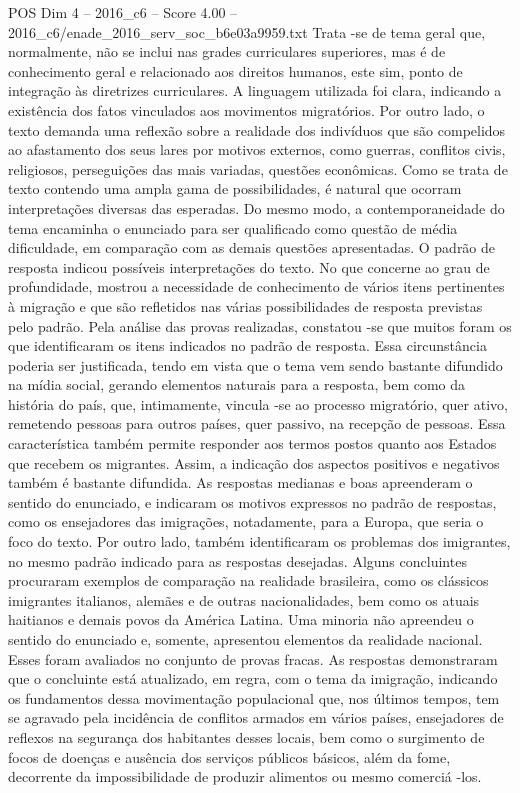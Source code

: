 \begin{textsample}{POS Dim 4 – 2016\_c6 – Score 4.00 – 2016\_c6/enade\_2016\_serv\_soc\_b6e03a9959.txt}
Trata -se de tema geral que, normalmente, não se inclui nas grades curriculares superiores, mas é de conhecimento geral e relacionado aos direitos humanos, este sim, ponto de integração às diretrizes curriculares.
A linguagem utilizada foi clara, indicando a existência dos fatos vinculados aos movimentos migratórios.
Por outro lado, o texto demanda uma reflexão sobre a realidade dos indivíduos que são compelidos ao afastamento dos seus lares por motivos externos, como guerras, conflitos civis, religiosos, perseguições das mais variadas, questões econômicas.
Como se trata de texto contendo uma ampla gama de possibilidades, é natural que ocorram interpretações diversas das esperadas.
Do mesmo modo, a contemporaneidade do tema encaminha o enunciado para ser qualificado como questão de média dificuldade, em comparação com as demais questões apresentadas.
O padrão de resposta indicou possíveis interpretações do texto.
No que concerne ao grau de profundidade, mostrou a necessidade de conhecimento de vários itens pertinentes à migração e que são refletidos nas várias possibilidades de resposta previstas pelo padrão.
Pela análise das provas realizadas, constatou -se que muitos foram os que identificaram os itens indicados no padrão de resposta.
Essa circunstância poderia ser justificada, tendo em vista que o tema vem sendo bastante difundido na mídia social, gerando elementos naturais para a resposta, bem como da história do país, que, intimamente, vincula -se ao processo migratório, quer ativo, remetendo pessoas para outros países, quer passivo, na recepção de pessoas.
Essa característica também permite responder aos termos postos quanto aos Estados que recebem os migrantes.
Assim, a indicação dos aspectos positivos e negativos também é bastante difundida.
As respostas medianas e boas apreenderam o sentido do enunciado, e indicaram os motivos expressos no padrão de respostas, como os ensejadores das imigrações, notadamente, para a Europa, que seria o foco do texto.
Por outro lado, também identificaram os problemas dos imigrantes, no mesmo padrão indicado para as respostas desejadas.
Alguns concluintes procuraram exemplos de comparação na realidade brasileira, como os clássicos imigrantes italianos, alemães e de outras nacionalidades, bem como os atuais haitianos e demais povos da América Latina.
Uma minoria não apreendeu o sentido do enunciado e, somente, apresentou elementos da realidade nacional.
Esses foram avaliados no conjunto de provas fracas.
As respostas demonstraram que o concluinte está atualizado, em regra, com o tema da imigração, indicando os fundamentos dessa movimentação populacional que, nos últimos tempos, tem se agravado pela incidência de conflitos armados em vários países, ensejadores de reflexos na segurança dos habitantes desses locais, bem como o surgimento de focos de doenças e ausência dos serviços públicos básicos, além da fome, decorrente da impossibilidade de produzir alimentos ou mesmo comerciá -los.

\end{textsample}
